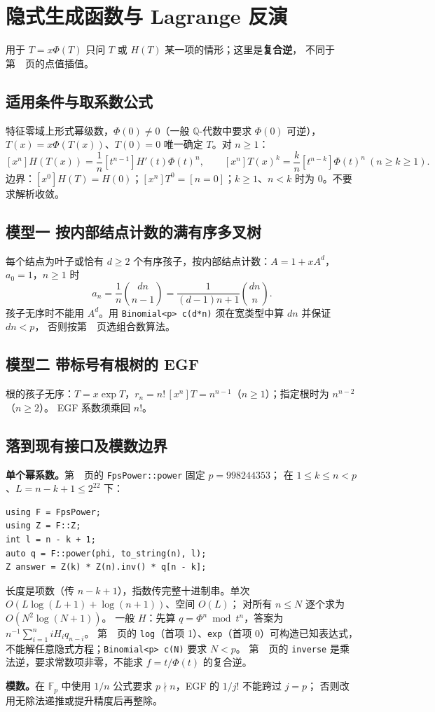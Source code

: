 \section{隐式生成函数与 Lagrange 反演}\label{knowledge-lagrange-inversion}
用于 $T=x\Phi(T)$ 只问 $T$ 或 $H(T)$ 某一项的情形；这里是\textbf{复合逆}，
不同于第~\pageref{compact-Lagrange}~页的点值插值。

\subsection{适用条件与取系数公式}
特征零域上形式幂级数，$\Phi(0)\ne0$（一般 $\mathbb Q$-代数中要求 $\Phi(0)$ 可逆），
$T(x)=x\Phi(T(x))$、$T(0)=0$ 唯一确定 $T$。对 $n\ge1$：
\[
\boxed{[x^n]H(T(x))=\frac1n[t^{n-1}]H'(t)\Phi(t)^n,}\qquad
\boxed{[x^n]T(x)^k=\frac{k}{n}[t^{n-k}]\Phi(t)^n\ (n\ge k\ge1).}
\]
边界：$[x^0]H(T)=H(0)$；$[x^n]T^0=[n=0]$；$k\ge1$、$n<k$ 时为 0。不要求解析收敛。

\subsection{模型一 按内部结点计数的满有序多叉树}
每个结点为叶子或恰有 $d\ge2$ 个有序孩子，按内部结点计数：$A=1+xA^d$，$a_0=1$，$n\ge1$ 时
\[
a_n=\frac1n\binom{dn}{n-1}=\frac1{(d-1)n+1}\binom{dn}{n}.
\]
孩子无序时不能用 $A^d$。用 \texttt{Binomial<p> c(d*n)} 须在宽类型中算 $dn$ 并保证 $dn<p$，
否则按第~\pageref{knowledge-binomial-choice}~页选组合数算法。

\subsection{模型二 带标号有根树的 EGF}
根的孩子无序：$T=x\exp T$，$r_n=n!\,[x^n]T=n^{n-1}$（$n\ge1$）；指定根时为 $n^{n-2}$（$n\ge2$）。
EGF 系数须乘回 $n!$。

\subsection{落到现有接口及模数边界}
\textbf{单个幂系数。}第~\pageref{compact-FpsPower}~页的 \texttt{FpsPower::power} 固定 $p=998244353$；
在 $1\le k\le n<p$、$L=n-k+1\le2^{22}$ 下：
\begin{lstlisting}
using F = FpsPower;
using Z = F::Z;
int l = n - k + 1;
auto q = F::power(phi, to_string(n), l);
Z answer = Z(k) * Z(n).inv() * q[n - k];
\end{lstlisting}
长度是项数（传 $n-k+1$），指数传完整十进制串。单次 $O(L\log(L+1)+\log(n+1))$、空间 $O(L)$；
对所有 $n\le N$ 逐个求为 $O(N^2\log(N+1))$。
一般 $H$：先算 $q=\Phi^n\bmod t^n$，答案为 $n^{-1}\sum_{i=1}^n iH_iq_{n-i}$。
第~\pageref{compact-FpsFunctions}~页的 \texttt{log}（首项 1）、\texttt{exp}（首项 0）可构造已知表达式，
不能解任意隐式方程；\texttt{Binomial<p> c(N)} 要求 $N<p$。
第~\pageref{compact-FpsInverse}~页的 \texttt{inverse} 是乘法逆，要求常数项非零，不能求 $f=t/\Phi(t)$ 的复合逆。

\textbf{模数。}在 $\mathbb F_p$ 中使用 $1/n$ 公式要求 $p\nmid n$，EGF 的 $1/j!$ 不能跨过 $j=p$；
否则改用无除法递推或提升精度后再整除。
